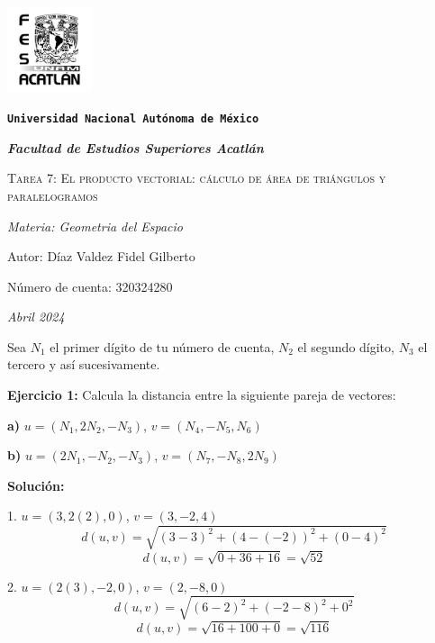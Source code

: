 \documentclass{article}
\begin{document}
\begin{titlepage}
    \centering   
    {\includegraphics[width=2.5cm]{logo.png}\par}
    {\texttt{\bfseries \LARGE Universidad Nacional Autónoma de México} \par}
    \vspace{1cm}
    {\itshape \Large \bfseries Facultad de Estudios Superiores Acatlán \par}
    \vspace{3cm}
    {\scshape \Huge Tarea 7: El producto vectorial: cálculo de área de triángulos y paralelogramos \par}
    \vspace {3cm}
    {\slshape \Large Materia: Geometria del Espacio \par}
    \vspace{2cm}
    {\Large Autor: Díaz Valdez Fidel Gilberto\par}
    {\Large Número de cuenta: 320324280\par}
    \vfill
    {\itshape Abril 2024 \par}
 \end{titlepage}

 Sea $N_1$ el primer dígito de tu número de cuenta, $N_2$ el segundo dígito, $N_3$ el tercero y así
sucesivamente.
\vspace{10pt}

\textbf{Ejercicio 1:} Calcula la distancia entre la siguiente pareja de vectores: 
\vspace{10pt}

\textbf{a)} $u = (N_1, 2N_2, -N_3)$, $v = (N_4, -N_5, N_6)$
\vspace{10pt}

\textbf{b)} $u =(2N_1, -N_2, -N_3)$, $v = (N_7, -N_8, 2N_9)$
\vspace{10pt}

\textbf{Solución:}
\vspace{10pt}

1. $u = (3, 2(2), 0)$, $v = (3, -2, 4)$
$$d(u,v) = \sqrt{(3-3)^2+(4-(-2))^2+(0-4)^2}$$
$$d(u,v) = \sqrt{0+36+16} = \sqrt{52}$$

2. $u =(2(3), -2, 0)$, $v = (2, -8, 0)$
$$d(u,v) = \sqrt{(6-2)^2+(-2-8)^2+0^2}$$
$$d(u,v) = \sqrt{16+100+0} = \sqrt{116}$$
\end{document}
